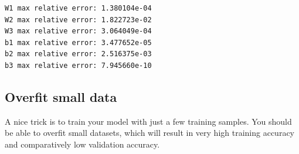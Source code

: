 \documentclass[11pt]{article}
\begin{document}
    \begin{Verbatim}[commandchars=\\\{\}]
W1 max relative error: 1.380104e-04
W2 max relative error: 1.822723e-02
W3 max relative error: 3.064049e-04
b1 max relative error: 3.477652e-05
b2 max relative error: 2.516375e-03
b3 max relative error: 7.945660e-10

    \end{Verbatim}

    \hypertarget{overfit-small-data}{%
\subsection{Overfit small data}\label{overfit-small-data}}

A nice trick is to train your model with just a few training samples.
You should be able to overfit small datasets, which will result in very
high training accuracy and comparatively low validation accuracy.
\end{document}
